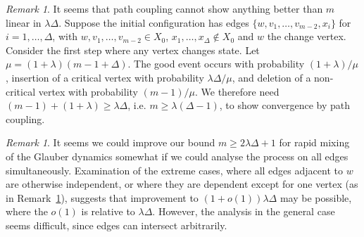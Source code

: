 \documentclass[11pt]{article}
\theoremstyle{definition}
\theoremstyle{remark}
\newtheorem{rem}[thm]{Remark}
\begin{document}
\begin{rem}\label{rem10}
It seems that path coupling cannot show anything better than $m$ linear in
$\lambda\Delta$. Suppose the initial configuration has edges
$\{w,v_1,\ldots,v_{m-2},x_i\}$ for $i=1,\ldots,\Delta$, with
$w,v_1,\ldots,v_{m-2}\in X_0$, $x_1,\ldots,x_\Delta\not\in X_0$ and $w$ the
change vertex. Consider the first step where any vertex changes state. Let
$\mu=(1+\lambda)(m-1+\Delta)$. The good event occurs with probability
$(1+\lambda)/\mu$, insertion of a critical vertex with probability
$\lambda\Delta/\mu$, and deletion of a non-critical vertex with probability
$(m-1)/\mu$. We therefore need $(m-1)+(1+\lambda)\geq\lambda\Delta$, i.e.
$m\geq \lambda(\Delta-1)$, to show convergence by path coupling.
\end{rem}
\begin{rem}
It seems we could improve our bound $m\geq 2\lambda\Delta+1$ for rapid
mixing of the Glauber dynamics somewhat if we could analyse the process on
all edges simultaneously. Examination of the extreme cases, where all edges
adjacent to $w$ are otherwise independent, or where they are dependent
except for one vertex (as in Remark~\ref{rem10}), suggests that improvement
to $(1+o(1))\lambda\Delta$ may be possible, where the $o(1)$ is relative to
$\lambda\Delta$. However, the analysis in the general case seems difficult,
since edges can intersect arbitrarily.
\end{rem}
\end{document}
